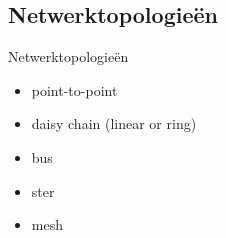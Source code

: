 \subsection*{Netwerktopologieën}

\begin{frame}{Netwerktopologieën}
\begin{itemize}
\item point-to-point
\item daisy chain (linear or ring)
\item bus
\item ster
\item mesh
\end{itemize}
\end{frame}

